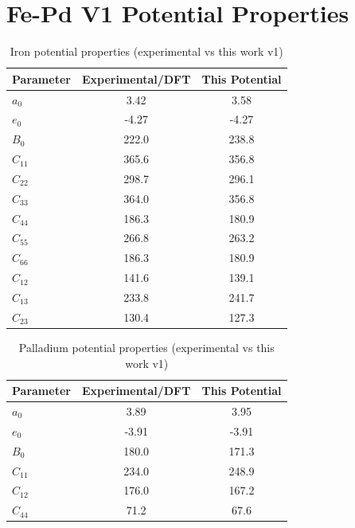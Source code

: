 \FloatBarrier
\section{Fe-Pd V1 Potential Properties}

\begin{table}[ht]
\renewcommand{\arraystretch}{1.2}
\begin{tabular}{lcc}
\hline\hline
Parameter & Experimental/DFT & This Potential\\
\hline\hline
$a_0$ & 3.42   &  3.58  \\
$e_0$ & -4.27  & -4.27  \\
$B_0$ & 222.0  &  238.8  \\
$C_{11}$ & 365.6  &  356.8 \\
$C_{22}$ & 298.7  &  296.1 \\
$C_{33}$ & 364.0  &  356.8 \\
$C_{44}$ & 186.3  &  180.9  \\
$C_{55}$ & 266.8  &  263.2 \\
$C_{66}$ & 186.3  &  180.9 \\
$C_{12}$ & 141.6  &  139.1 \\
$C_{13}$ & 233.8  &  241.7 \\
$C_{23}$ & 130.4  &  127.3 \\
\hline\hline
\end{tabular}
\label{tab:ironpotpropertiesv1}
\caption{Iron potential properties (experimental vs this work v1)}
\end{table}

\begin{table}[ht]
\renewcommand{\arraystretch}{1.2}
\begin{tabular}{lcc}
\hline\hline
Parameter & Experimental/DFT & This Potential\\
\hline\hline
$a_0$ & 3.89 & 3.95  \\
$e_0$ & -3.91  & -3.91  \\
$B_0$ & 180.0  & 171.3  \\
$C_{11}$ & 234.0  & 248.9  \\
$C_{12}$ & 176.0  & 167.2  \\
$C_{44}$ & 71.2  & 67.6  \\
\hline\hline
\end{tabular}
\label{tab:palladiumpotpropertiesv1}
\caption{Palladium potential properties (experimental vs this work v1)}
\end{table}




